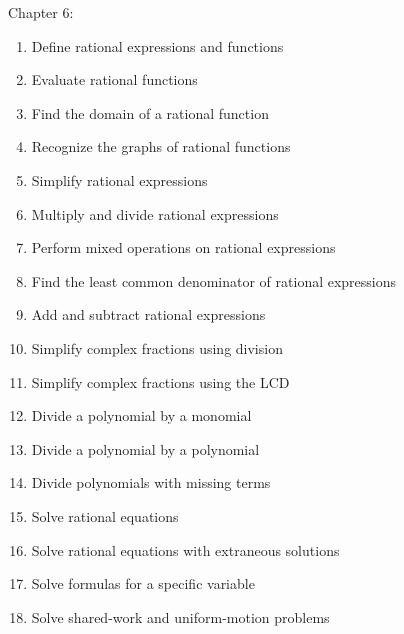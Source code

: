\documentclass[11pt]{article}
\newenvironment{alphalist}{
\begin{enumerate}[label=(\arabic*),widest=107 ,leftmargin=25pt, itemsep=0pt]}
{\end{enumerate}}
\begin{document}
\noindent Chapter 6:
\begin{alphalist}
    \item Define rational expressions and functions
    \item Evaluate rational functions
    \item Find the domain of a rational function
    \item Recognize the graphs of rational functions
    \item Simplify rational expressions
    \item Multiply and divide rational expressions
    \item Perform mixed operations on rational expressions
    \item Find the least common denominator of rational expressions
    \item Add and subtract rational expressions
    \item Simplify complex fractions using division
    \item Simplify complex fractions using the LCD
    \item Divide a polynomial by a monomial
    \item Divide a polynomial by a polynomial
    \item Divide polynomials with missing terms 
    \item Solve rational equations
    \item Solve rational equations with extraneous solutions
    \item Solve formulas for a specific variable
    \item Solve shared-work and uniform-motion problems
\end{alphalist}
\end{document}
